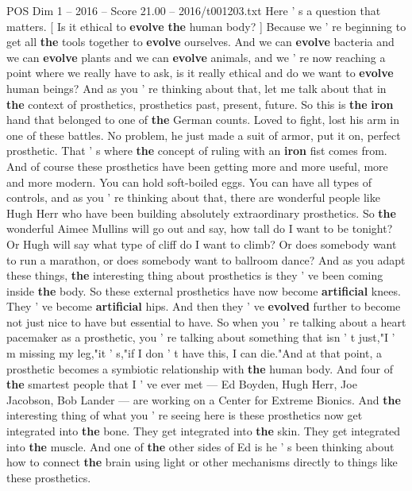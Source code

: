 \begin{textsample}{POS Dim 1 – 2016 – Score 21.00 – 2016/t001203.txt}  \label{ex:f1_pos_052}
Here ' s a question that matters. [ Is it ethical to \textbf{evolve} \textbf{the} human body? ] Because we ' re beginning to get all \textbf{the} tools together to \textbf{evolve} ourselves.
And we can \textbf{evolve} bacteria and we can \textbf{evolve} plants and we can \textbf{evolve} animals, and we ' re now reaching a point where we really have to ask, is it really ethical and do we want to \textbf{evolve} human beings?
And as you ' re thinking about that, let me talk about that in \textbf{the} context of prosthetics, prosthetics past, present, future.
So this is \textbf{the} \textbf{iron} hand that belonged to one of \textbf{the} German counts.
Loved to fight, lost his arm in one of these battles.
No problem, he just made a suit of armor, put it on, perfect prosthetic.
That ' s where \textbf{the} concept of ruling with an \textbf{iron} fist comes from.
And of course these prosthetics have been getting more and more useful, more and more modern.
You can hold soft-boiled eggs.
You can have all types of controls, and as you ' re thinking about that, there are wonderful people like Hugh Herr who have been building absolutely extraordinary prosthetics.
So \textbf{the} wonderful Aimee Mullins will go out and say, how tall do I want to be tonight?
Or Hugh will say what type of cliff do I want to climb?
Or does somebody want to run a marathon, or does somebody want to ballroom dance?
And as you adapt these things, \textbf{the} interesting thing about prosthetics is they ' ve been coming inside \textbf{the} body.
So these external prosthetics have now become \textbf{artificial} knees.
They ' ve become \textbf{artificial} hips.
And then they ' ve \textbf{evolved} further to become not just nice to have but essential to have.
So when you ' re talking about a heart pacemaker as a prosthetic, you ' re talking about something that isn ' t just,"I ' m missing my leg,"it ' s,"if I don ' t have this, I can die."And at that point, a prosthetic becomes a symbiotic relationship with \textbf{the} human body.
And four of \textbf{the} smartest people that I ' ve ever met — Ed Boyden, Hugh Herr, Joe Jacobson, Bob Lander — are working on a Center for Extreme Bionics.
And \textbf{the} interesting thing of what you ' re seeing here is these prosthetics now get integrated into \textbf{the} bone.
They get integrated into \textbf{the} skin.
They get integrated into \textbf{the} muscle.
And one of \textbf{the} other sides of Ed is he ' s been thinking about how to connect \textbf{the} brain using light or other mechanisms directly to things like these prosthetics.

\end{textsample}
